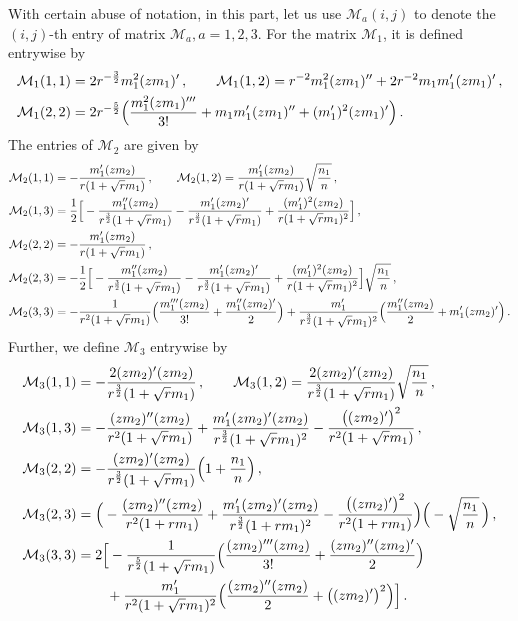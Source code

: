 \documentclass[12pt]{article}
\numberwithin{equation}{section}
\theoremstyle{remark}
\newcommand{\1}{{\rm 1}\kern-0.24em{\rm I}}
\begin{document}
\begin{appendices}
With certain abuse of notation, in this part, let us use ${\mathcal{M}}_a(i,j)$ to denote the $(i,j)$-th entry of matrix $ \mathcal{M}_a, a=1,2,3$. For the  matrix $\mathcal{M}_1$, it is defined entrywise by 
\begin{align*}
&\mathcal{M}_1(1,1)=2r^{-\frac 32}m_1^2(zm_1)' \,,\qquad \mathcal{M}_1(1,2)=r^{-2}m_1^2(zm_1)''+ 2r^{-2}m_1m_1'(zm_1)'\,, \notag\\
&\mathcal{M}_1(2,2)= 2r^{-\frac 52}\Big( \frac{m_1^2(zm_1)'''}{3!} + m_1m_1'(zm_1)'' + (m_1')^2(zm_1)'\Big)\,.
\end{align*}
 The entries of $\mathcal{M}_2$ are given by 
 \begin{align*}
 &\mathcal{M}_2(1,1)=-\frac{m_1'(zm_2)}{r(1+\sqrt r m_1)}\,,\qquad \mathcal{M}_2(1,2)=\frac{m_1'(zm_2)}{r(1+\sqrt r m_1)} \sqrt{\frac{n_1}{n}}\,, \notag\\
&\mathcal{M}_2(1,3)=\frac{1}{2}\Big[ -\frac{m_1''(zm_2)}{r^{\frac 32}(1+\sqrt r m_1)} -\frac{m_1'(zm_2)'}{r^{\frac 32}(1+\sqrt r m_1)}+ \frac{(m_1')^2(zm_2)}{r(1+\sqrt r m_1)^2}\Big]\,,\notag\\
&\mathcal{M}_2(2,2)= -\frac{m_1'(zm_2)}{r(1+\sqrt r m_1)}\,,\notag\\
&\mathcal{M}_2(2,3)=- \frac{1}{2}\Big[ -\frac{m_1''(zm_2)}{r^{\frac 32}(1+\sqrt r m_1)} -\frac{m_1'(zm_2)'}{r^{\frac 32}(1+\sqrt r m_1)}+ \frac{(m_1')^2(zm_2)}{r(1+\sqrt r m_1)^2}\Big] \sqrt{\frac{n_1}{n}} \,,\notag\\
&\mathcal{M}_2(3,3)= -\frac{1}{r^2(1+\sqrt r m_1)} \Big( \frac{m_1'''(zm_2)}{3!} + \frac{m_1''(zm_2)'}{2}\Big) +  \frac{m_1'}{r^{\frac32}(1+\sqrt r m_1)^2} \Big( \frac{m_1''(zm_2)}{2} + m_1'(zm_2)' \Big)\,. 
 \end{align*}
Further, we define  $\mathcal{M}_3$ entrywise by 
 \begin{align*}
 &\mathcal{M}_3(1,1)=-\frac{2(zm_2)'(zm_2)}{r^{\frac 32}(1+\sqrt r m_1)}\,,\qquad\mathcal{M}_3(1,2)=\frac{2(zm_2)'(zm_2)}{r^{\frac 32}(1+\sqrt r m_1)}\sqrt{\frac{n_1}{n}} \,,\notag\\
&\mathcal{M}_3(1,3)= -\frac{(zm_2)''(zm_2)}{r^2(1+\sqrt r m_1)} + \frac{m_1'(zm_2)'(zm_2)}{r^{\frac 32}(1+\sqrt r m_1)^2} - \frac{\big((zm_2)'\big)^2}{r^2(1+\sqrt r m_1)}  \,,\notag\\
&\mathcal{M}_3(2,2)= -\frac{(zm_2)'(zm_2)}{r^{\frac 32}(1+\sqrt r m_1)}\Big(1+\frac{n_1}{n}\Big)\,,\notag\\
&\mathcal{M}_3(2,3)=\Big( -\frac{(zm_2)''(zm_2)}{r^2(1+r m_1)} + \frac{ m_1'(zm_2)'(zm_2)}{r^{\frac 32}(1+r m_1)^2} - \frac{\big((zm_2)'\big)^2}{r^2(1+r m_1)} \Big)\Big(- \sqrt{\frac{n_1}{n}}\, \Big)\,,\notag\\
&\mathcal{M}_3(3,3)=2\Big[  -\frac{1}{r^{\frac 52}(1+\sqrt r m_1)} \Big( \frac{(zm_2)'''(zm_2)}{3!} + \frac{(zm_2)''(zm_2)'}{2}\Big) \notag\\
&\qquad\qquad \qquad +  \frac{m_1'}{r^2(1+\sqrt r m_1)^2} \Big( \frac{(zm_2)''(zm_2)}{2} + \big((zm_2)' \big)^2\Big)\Big]\,. 
 \end{align*}
 

\end{appendices}
\end{document}
